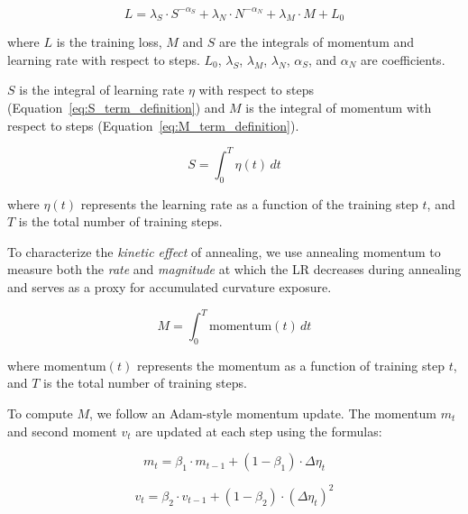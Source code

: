 \documentclass[letterpaper]{article} %
\begin{document}
\begin{equation}
	L = \lambda_S \cdot S^{-\alpha_S} + \lambda_N \cdot N^{-\alpha_N} + \lambda_M \cdot M + L_0
	\label{eq:Loss_S_N_M_E_function}
\end{equation}

\noindent 
where \(L\) is the training loss, \(M\) and \(S\) are the integrals of momentum and learning rate with respect to steps. \(L_0\), \(\lambda_S\), \(\lambda_M\), \(\lambda_N\), \(\alpha_S\), and \(\alpha_N\) are coefficients.

\(S\) is the integral of learning rate \( \eta \) with respect to steps (Equation~\ref{eq:S_term_definition}) and \(M\) is the integral of momentum with respect to steps (Equation~\ref{eq:M_term_definition}).

\begin{equation}
	S = \int_0^{T} \eta(t) \, dt
	\label{eq:S_term_definition}
\end{equation}

\noindent where \( \eta(t) \) represents the learning rate as a function of the training step \( t \), and \( T \) is the total number of training steps.

To characterize the \emph{kinetic effect} of annealing, we use annealing momentum to measure both the \emph{rate} and \emph{magnitude} at which the LR decreases during annealing and serves as a proxy for accumulated curvature exposure.

\begin{equation}
	M = \int_0^{T} \text{momentum}(t) \, dt
	\label{eq:M_term_definition}
\end{equation}

\noindent where \( \text{momentum}(t) \) represents the momentum as a function of training step \( t \), and \( T \) is the total number of training steps. 

To compute \(M\), we follow an Adam-style momentum update. The momentum \( m_t \) and second moment \( v_t \) are updated at each step using the formulas:

\begin{equation}
	m_t = \beta_1 \cdot m_{t-1} + (1 - \beta_1) \cdot \Delta \eta_t  
	\label{eq:m_t_definition}
\end{equation}

\begin{equation}
	v_t = \beta_2 \cdot v_{t-1} + (1 - \beta_2) \cdot (\Delta \eta_t)^2
	\label{eq:v_t_definition}
\end{equation}
\end{document}
